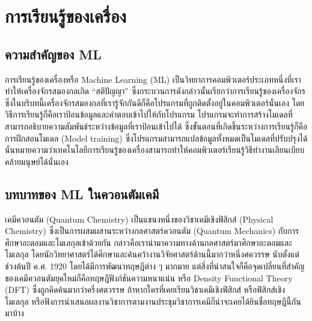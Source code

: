 

\chapter{การเรียนรู้ของเครื่อง}
\label{ch:ml}

\section{ความสำคัญของ ML}

การเรียนรู้ของเครื่องหรือ Machine Learning (ML) เป็นวิทยาการคอมพิวเตอร์ประเภทหนึ่งที่เราทำให้เครื่องจักรสมองกลเกิด \enquote{สติปัญญา} 
ซึ่งกระบวนการดังกล่าวนั้นเรียกว่าการเรียนรู้ของเครื่องจักร ซึ่งในบริบทนี้เครื่องจักรสมองกลที่เรารู้จักกันดีก็คือโปรแกรมที่ถูกติดตั้งอยู่ในคอมพิวเตอร์นั่นเอง
โดยวิธีการเรียนรู้ก็คือเราป้อนข้อมูลและคำตอบเข้าไปให้กับโปรแกรม โปรแกรมจะทำการสร้างโมเดลที่สามารถอธิบายความสัมพันธ์ระหว่างข้อมูลที่เราป้อนเข้าไปได้ 
ซึ่งขั้นตอนที่เกิดขึ้นระหว่างการเรียนรู้ก็คือการฝึกสอนโมเดล (Model training) ซึ่งโปรแกรมสามารถแปลข้อมูลทั้งหมดเป็นโมเดลที่ปรับปรุงได้ 
นั่นหมายความว่าเทคโนโลยีการเรียนรู้ของเครื่องสามารถทำให้คอมพิวเตอร์เรียนรู้วิธีทำงานเลียนเบียบคล้ายมนุษย์ได้นั่นเอง 

\section{บทบาทของ ML ในควอนตัมเคมี}

เคมีควอนตัม (Quantum Chemistry) เป็นแขนงหนึ่งของวิชาเคมีเชิงฟิสิกส์ (Physical Chemistry) ซึ่งเป็นการผสมผสานระหว่างกลศาสตร์ควอนตัม 
(Quantum Mechanics) กับการศึกษาอะตอมและโมเลกุลเข้าด้วยกัน กล่าวคือเรานำมาความทางด้านกลศาสตร์มาศึกษาอะตอมและโมเลกุล
โดยนักวิทยาศาสตร์ได้ศึกษาและค้นคว้างานวิจัยศาสตร์ด้านนี้มากว่าหนึ่งศควรรษ นับตั้งแต่ช่วงต้นปี ค.ศ. 1920 โดยได้มีการพัฒนาทฤษฎีต่าง ๆ มากมาย 
แต่สิ่งที่น่าสนใจก็คือจุดเปลี่ยนที่สำคัญของเคมีควอนตัมยุคใหม่ก็คือทฤษฎีฟังก์ชันความหนาแน่น หรือ Density Functional Theory (DFT) 
ซึ่งถูกคิดค้นมากว่าครึ่งศตวรรษ ถ้าหากใครที่เคยเรียนวิชาเคมีเชิงฟิสิกส์ หรือฟิสิกส์เชิงโมเลกุล หรือฟังการนำเสนอผลงานวิชาการตามงานประชุมวิชาการเคมีก็น่าจะเคยได้ยินชื่อทฤษฎีนี้กันมาบ้าง 

